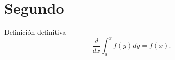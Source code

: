 
\chapter{Segundo}

\lipsum[1-3]

\begin{defn} Definición definitiva $$\frac{d}{dx}\int_a^xf(y)dy=f(x).$$\end{defn}
